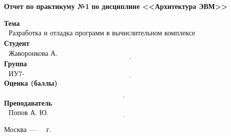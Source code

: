 \begin{titlepage}
	
	\begin{center}
		\noindent\begin{minipage}{1.3\textwidth}\centering
			\Large\textbf{   Отчет по практикуму №1}\newline
			\textbf{по дисциплине <<Архитектура ЭВМ>>}\newline\newline\newline
		\end{minipage}
	\end{center}
	
	\noindent\textbf{Тема} $\underline{\text{~~Разработка и отладка программ в вычислительном комплексе Тераграф~~~~~~~~~~~~~~~~~~~~~~~~~~~~~~~~~~~~~~~~~~~~~~~~~~~~~~~~~~}}$\newline\newline
	\noindent\textbf{Студент} $\underline{\text{~~Жаворонкова А. А.~~~~~~~~~~~~~~~~~~~~~~~~~~~~~~~~~~~~~~~~~~~~~~~~~~~~~~~~~~~~~~~~~~~~~~~~~~~~~~~~~~~~~~}}$\newline\newline
	\noindent\textbf{Группа} $\underline{\text{~~ИУ7-56Б~~~~~~~~~~~~~~~~~~~~~~~~~~~~~~~~~~~~~~~~~~~~~~~~~~~~~~~~~~~~~~~~~~~~~~~~~~~~~~~~~~~~~~~~~~~~~~~~~~~~~~}}$\newline\newline
	\noindent\textbf{Оценка (баллы)} $\underline{\text{~~~~~~~~~~~~~~~~~~~~~~~~~~~~~~~~~~~~~~~~~~~~~~~~~~~~~~~~~~~~~~~~~~~~~~~~~~~~~~~~~~~~~~~~~~~~~~~~~~~~~~~}}$\newline\newline
	\noindent\textbf{Преподаватель} $\underline{\text{~~Попов А. Ю.~~~~~~~~~~~~~~~~~~~~~~~~~~~~~~~~~~~~~~~~~~~~~~~~~~~~~~~~~~~~~~~~~~~~~~~~~~~~~~~~~~~~}}$\newline
	
	\begin{center}
		\vfill
		Москва~---~\the\year
		~г.
	\end{center}
	\restoregeometry
\end{titlepage}
